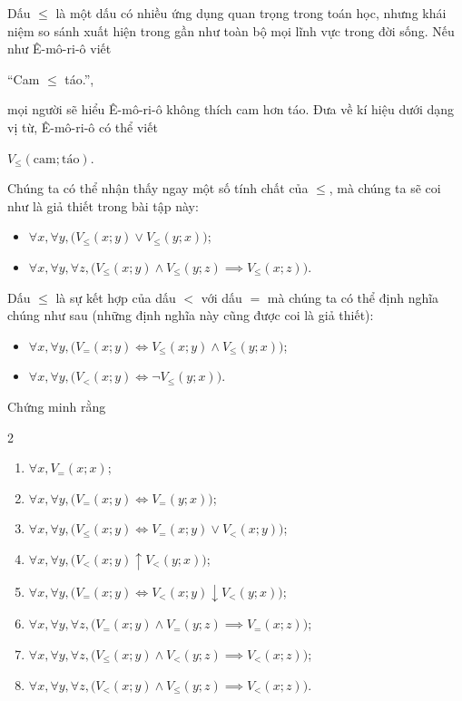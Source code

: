 \exercise Dấu $\le$ là một dấu có nhiều ứng dụng quan trọng trong toán học, nhưng khái niệm so sánh xuất hiện trong gần như toàn bộ mọi lĩnh vực trong đời sống. Nếu như Ê-mô-ri-ô viết
\begin{center}
    ``Cam $\le$ táo.'', 
\end{center}
mọi người sẽ hiểu Ê-mô-ri-ô không thích cam hơn táo. Đưa về kí hiệu dưới dạng vị từ, Ê-mô-ri-ô có thể viết
\begin{center}
    $V_\le (\text{cam}; \text{táo})$.
\end{center}
Chúng ta có thể nhận thấy ngay một số tính chất của $\le$, mà chúng ta sẽ coi như là giả thiết trong bài tập này:
\begin{itemize}
    \item $\forall x, \forall y, \big(V_\le(x; y) \lor V_\le(y; x)\big)$;
    \item $\forall x, \forall y, \forall z, \big(V_\le(x; y) \land V_\le(y; z) \implies V_\le(x; z)\big)$.
\end{itemize}
Dấu $\le$ là sự kết hợp của dấu $<$ với dấu $=$ mà chúng ta có thể định nghĩa chúng như sau (những định nghĩa này cũng được coi là giả thiết):
\begin{itemize}
    \item $\forall x, \forall y, \big(V_=(x; y) \iff V_\le(x; y) \land V_\le(y; x)\big)$;
    \item $\forall x, \forall y, \big(V_<(x; y) \iff \neg V_\le(y; x)\big)$.
\end{itemize}
Chứng minh rằng
\begin{multicols}{2}
    \begin{enumerate}
        \item $\forall x, V_=(x; x)$;
        \item $\forall x, \forall y, \big(V_=(x; y) \iff V_=(y; x)\big)$;
        \item $\forall x, \forall y, \big(V_\le(x; y) \iff V_=(x; y) \lor V_<(x; y)\big)$;
        \item $\forall x, \forall y, \big(V_<(x; y) \uparrow V_<(y; x)\big)$;
        \item $\forall x, \forall y, \big(V_=(x; y) \iff V_<(x; y) \downarrow V_<(y; x)\big)$;
        \item $\forall x, \forall y, \forall z, \big(V_=(x; y) \land V_=(y; z) \implies V_=(x; z)\big)$;
        \item $\forall x, \forall y, \forall z, \big(V_\le(x; y) \land V_<(y; z) \implies V_<(x; z)\big)$;
        \item $\forall x, \forall y, \forall z, \big(V_<(x; y) \land V_\le(y; z) \implies V_<(x; z)\big)$.
    \end{enumerate}
\end{multicols}

